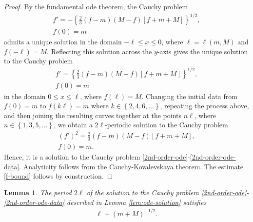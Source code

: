 \documentclass[12pt,reqno]{amsart}
\numberwithin{equation}{section}  %
\newtheorem{lemma}[theorem]{Lemma}
\begin{document}
\begin{proof}
By the fundamental ode theorem, the Cauchy problem
\begin{gather}
  \label{ode-cauchy-left}
   f'
  = -\left \{ \frac{2}{3} \left (f-m\right )
  \left( M -f \right )
  \left [ f  +m +M \right ] \right
  \}^{1/2},
  \\
\label{ode-cauchy-data-left}
   f(0) = m
\end{gather}
admits a unique solution in the domain $-\ell \le x \le 0$, where $\ell =
\ell(m, M)$ and $f(-\ell) = M$. Reflecting this solution across the $y$-axis
gives the unique solution to the Cauchy problem 
\begin{gather}
  \label{ode-cauchy-right}
   f'
  = \left \{ \frac{2}{3} \left (f-m\right )
  \left( M -f \right )
  \left [ f  +m +M  \right ] \right
  \}^{1/2},
  \\
\label{ode-cauchy-data-right}
   f(0) = m
\end{gather}
in the domain $0 \le x \le \ell$, where $f(\ell) = M$. 
Changing the
initial data from $f(0) = m$ to $f(k\ell)=m$ where $k \in \left\{ 2, 4, 6,\dots
\right\}$, repeating the process above, and then joining the resulting curves
together at the points $n \ell$, where $n \in \left\{ 1,3,5,\dots \right\}$, we
obtain a $2\ell$-periodic
solution to the Cauchy problem
\begin{gather}
  (f')^{2}
  = \frac{2}{3} \left (f-m\right )
  \left( M -f \right )
  \left [ f + m +M  \right ],
  \\
   f(0) = m.
\end{gather}
Hence, it is a solution to the Cauchy problem
\eqref{2nd-order-ode}-\eqref{2nd-order-ode-data}. Analyticity follows from the
Cauchy-Kovalevskaya theorem. The
estimate \eqref{f-bound} follows by construction.
%
%
\end{proof}
%
%
%
%
%
%
%
%
%
%
%
\begin{lemma}
  The period $2 \ell$ of the solution to the Cauchy problem
  \eqref{2nd-order-ode}-\eqref{2nd-order-ode-data} described in Lemma
  \ref{lem:ode-solution} satisfies
  \begin{equation}
  \begin{split}
    \ell \sim (m + M)^{-1/2}.
  \end{split}
  \label{period-est}
  \end{equation}
\label{lem:period-est}
\end{lemma}
\end{document}
